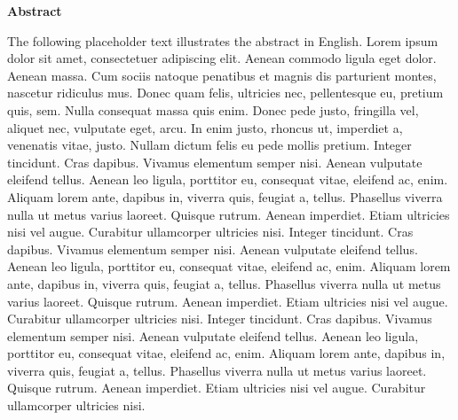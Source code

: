 \thispagestyle{empty}


\vspace*{1cm}

\begin{center}
    \textbf{Abstract}
\end{center}

\vspace*{1cm}

\noindent 
The following placeholder text illustrates the abstract in English. Lorem ipsum dolor sit amet, consectetuer adipiscing elit. Aenean commodo ligula eget dolor. Aenean massa. Cum sociis natoque penatibus et magnis dis parturient montes, nascetur ridiculus mus. Donec quam felis, ultricies nec, pellentesque eu, pretium quis, sem. Nulla consequat massa quis enim. Donec pede justo, fringilla vel, aliquet nec, vulputate eget, arcu. In enim justo, rhoncus ut, imperdiet a, venenatis vitae, justo. Nullam dictum felis eu pede mollis pretium. Integer tincidunt. Cras dapibus. Vivamus elementum semper nisi. Aenean vulputate eleifend tellus. Aenean leo ligula, porttitor eu, consequat vitae, eleifend ac, enim. Aliquam lorem ante, dapibus in, viverra quis, feugiat a, tellus. Phasellus viverra nulla ut metus varius laoreet. Quisque rutrum. Aenean imperdiet. Etiam ultricies nisi vel augue. Curabitur ullamcorper ultricies nisi. Integer tincidunt. Cras dapibus. Vivamus elementum semper nisi. Aenean vulputate eleifend tellus. Aenean leo ligula, porttitor eu, consequat vitae, eleifend ac, enim. Aliquam lorem ante, dapibus in, viverra quis, feugiat a, tellus. Phasellus viverra nulla ut metus varius laoreet. Quisque rutrum. Aenean imperdiet. Etiam ultricies nisi vel augue. Curabitur ullamcorper ultricies nisi. Integer tincidunt. Cras dapibus. Vivamus elementum semper nisi. Aenean vulputate eleifend tellus. Aenean leo ligula, porttitor eu, consequat vitae, eleifend ac, enim. Aliquam lorem ante, dapibus in, viverra quis, feugiat a, tellus. Phasellus viverra nulla ut metus varius laoreet. Quisque rutrum. Aenean imperdiet. Etiam ultricies nisi vel augue. Curabitur ullamcorper ultricies nisi.